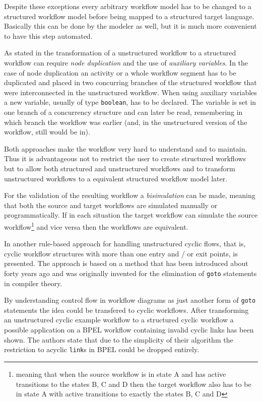 Despite these exceptions every arbitrary workflow model has to be changed to a structured workflow model before being mapped to a structured target language. Basically this can be done by the modeler as well, but it is much more convenient to have this step automated.

As stated in \cite{strucWFmodeling} the transformation of a unstructured workflow to a structured workflow can require \emph{node duplication} and the use of \emph{auxiliary variables}. In the case of node duplication an activity or a whole workflow segment has to be duplicated and placed in two concurring branches of the structured workflow that were interconnected in the unstructured workflow. When using auxiliary variables a new variable, usually of type \verb|boolean|, has to be declared. The variable is set in one branch of a concurrency structure and can later be read, remembering in which branch the workflow was earlier (and, in the unstructured version of the workflow, still would be in).

Both approaches make the workflow very hard to understand and to maintain. Thus it is advantageous not to restrict the user to create structured workflows but to allow both structured and unstructured workflows and to transform unstructured workflows to a equivalent structured workflow model later.

For the validation of the resulting workflow a \emph{bisimulation} can be made, meaning that both the source and target workflows are simulated manually or programmatically. If in each situation the target workflow can simulate the source workflow\footnote{meaning that when the source workflow is in state A and has active transitions to the states B, C and D then the target workflow also has to be in state A with active transitions to exactly the states B, C and D} and vice versa then the workflows are equivalent.

In \cite{untanglingCyclicFlows} another rule-based approach for handling unstructured cyclic flows, that is, cyclic workflow structures with more than one entry and / or exit points, is presented. The approach is based on a method that has been introduced about forty years ago and was originally invented for the elimination of \verb|goto| statements in compiler theory.

By understanding control flow in workflow diagrams as just another form of \verb|goto| statements the idea could be transfered to cyclic workflows. After transforming an unstructured cyclic example workflow to a structured cyclic workflow a possible application on a BPEL workflow containing invalid cyclic links has been shown. The authors state that due to the simplicity of their algorithm the restriction to acyclic \verb|link|s in BPEL could be dropped entirely.


